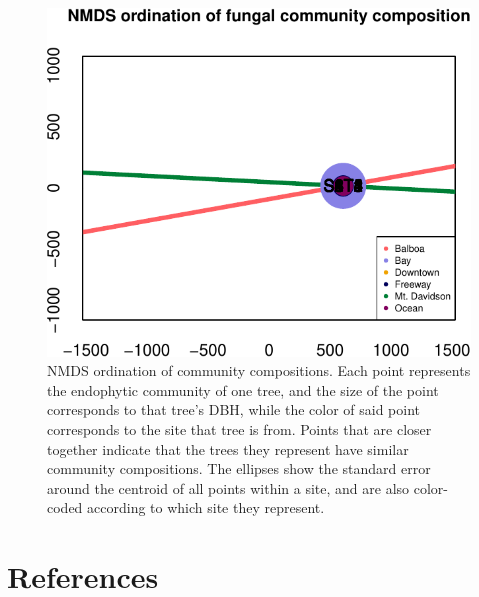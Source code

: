 \documentclass[fleqn,10pt,lineno]{wlpeerj} %
\begin{document}
\begin{figure}
\centering
\includegraphics{gibson2021_files/figure-latex/nmds-plot-1.pdf}
\caption{\label{fig:nmds-plot}NMDS ordination of community compositions. Each point represents the endophytic community of one tree, and the size of the point corresponds to that tree's DBH, while the color of said point corresponds to the site that tree is from. Points that are closer together indicate that the trees they represent have similar community compositions. The ellipses show the standard error around the centroid of all points within a site, and are also color-coded according to which site they represent.}
\end{figure}

\hypertarget{references}{%
\section*{References}\label{references}}
\end{document}
